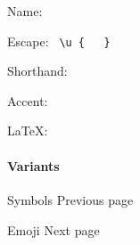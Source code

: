 { }

\subsubsection{\texorpdfstring{{ }}{ }}\label{section}

Name: \texttt{\ }


Escape: \texttt{\ \textbackslash{}u\ \{\ }{\texttt{\ }}\texttt{\ \}\ }


Shorthand: \texttt{\ }

{ }

Accent:


LaTeX: \texttt{\ }

\paragraph{Variants}\label{variants}

{ }

\href{/docs/reference/symbols/}{\pandocbounded{}}

{ Symbols } { Previous page }

\href{/docs/reference/symbols/emoji/}{\pandocbounded{}}

{ Emoji } { Next page }


